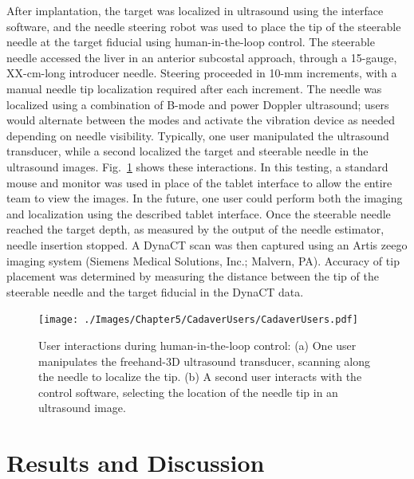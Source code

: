 After implantation, the target was localized in ultrasound using the interface software, and the needle steering robot was used to place the tip of the steerable needle at the target fiducial using human-in-the-loop control. The steerable needle accessed the liver in an anterior subcostal approach, through a 15-gauge, XX-cm-long introducer needle. Steering proceeded in 10-mm increments, with a manual needle tip localization required after each increment. The needle was localized using a combination of B-mode and power Doppler ultrasound; users would alternate between the modes and activate the vibration device as needed depending on needle visibility. Typically, one user manipulated the ultrasound transducer, while a second localized the target and steerable needle in the ultrasound images. Fig.~\ref{fig:CadaverUsers} shows these interactions. In this testing, a standard mouse and monitor was used in place of the tablet interface to allow the entire team to view the images. In the future, one user could perform both the imaging and localization using the described tablet interface. Once the steerable needle reached the target depth, as measured by the output of the needle estimator, needle insertion stopped. A DynaCT scan was then captured using an Artis zeego imaging system (Siemens Medical Solutions, Inc.; Malvern, PA). Accuracy of tip placement was determined by measuring the distance between the tip of the steerable needle and the target fiducial in the DynaCT data.

\begin{figure}[!t]
\centering
\texttt{[image: ./Images/Chapter5/CadaverUsers/CadaverUsers.pdf]}%
\caption[User interactions during human-in-the-loop control]{User interactions during human-in-the-loop control: (a) One user manipulates the freehand-3D ultrasound transducer, scanning along the needle to localize the tip. (b) A second user interacts with the control software, selecting the location of the needle tip in an ultrasound image. }
\label{fig:CadaverUsers}
\end{figure} 

\section{Results and Discussion}
\label{sec:HumanInTheLoopResults}
